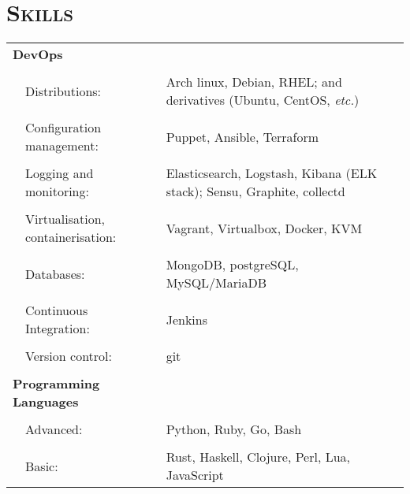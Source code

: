 \documentclass[a4paper,10pt]{article} %
\begin{document}
\section{\textsc{Skills}}
\begin{tabularx}{\textwidth}{p{0.3cm}|p{4cm}X}
\multicolumn{2}{l}{\textbf{DevOps}} & \\
\multicolumn{3}{c}{} \\ %
   & Distributions:                      & Arch linux, Debian, RHEL; and derivatives (Ubuntu, CentOS, \emph{etc.}) \\
     \\
   & Configuration management:           & Puppet, Ansible, Terraform \\
     \\
   & Logging and monitoring:             & Elasticsearch, Logstash, Kibana (ELK stack); Sensu, Graphite, collectd \\
     \\
   & Virtualisation, containerisation:   & Vagrant, Virtualbox, Docker, KVM \\
     \\
   & Databases:                          & MongoDB, postgreSQL, MySQL/MariaDB \\
     \\
   & Continuous Integration:             & Jenkins \\
     \\
   & Version control:                    & git \\
\multicolumn{3}{c}{} \\ %
\multicolumn{2}{l}{\textbf{Programming Languages}}      & \\
\multicolumn{3}{c}{} \\ %
  &  Advanced:                           & Python, Ruby, Go, Bash \\
     \\
  &  Basic:                              & Rust, Haskell, Clojure, Perl, Lua, JavaScript \\
\end{tabularx}

\end{document}
